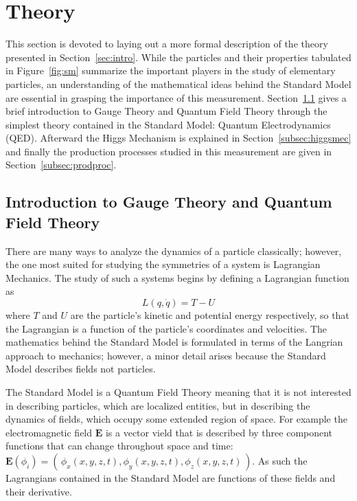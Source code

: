 \section{Theory}
\label{sec:theory}

This section is devoted to laying out a more formal description of the
theory presented in Section~\ref{sec:intro}. While the particles and
their properties tabulated in Figure~\ref{fig:sm} summarize the important
players in the study of elementary particles, an understanding of the
mathematical ideas behind the Standard Model are essential in grasping
the importance of this measurement. Section~\ref{subsec:qed} gives a brief
introduction to Gauge Theory and Quantum Field Theory through the simplest
theory contained in the Standard Model: Quantum Electrodynamics (QED).
Afterward the Higgs Mechanism is explained in Section~\ref{subsec:higgsmec}
and finally the production processes studied in this measurement are
given in Section~\ref{subsec:prodproc}.


\subsection{Introduction to Gauge Theory and Quantum Field Theory}
\label{subsec:qed}

There are many ways to analyze the dynamics of a particle classically; however,
the one most suited for studying the symmetries of a system is Lagrangian Mechanics.
The study of such a systems begins by defining a Lagrangian function as
\begin{equation}
    L(q, \dot q) = T - U 
\end{equation}
where $T$ and $U$ are the particle's kinetic and potential energy respectively, 
so that the Lagrangian is a function of the particle's coordinates and velocities. 
The mathematics behind the Standard Model is formulated in terms of the Langrian
approach to mechanics; however, a minor detail arises because the Standard Model
describes fields not particles.

The Standard Model is a Quantum Field Theory meaning that it is not interested in
describing particles, which are localized entities, but in describing the
dynamics of fields, which occupy some extended region of space. For example the
electromagnetic field $\mathbf{E}$ is a vector vield that is described 
by three component functions that can change throughout space and time: 
$\mathbf{E}(\phi_i) = (\,\phi_x(x,y,z,t), \phi_y(x,y,z,t), \phi_z(x,y,z,t)\,)$. 
As such the Lagrangians contained in the Standard Model are functions of these
fields and their derivative.

